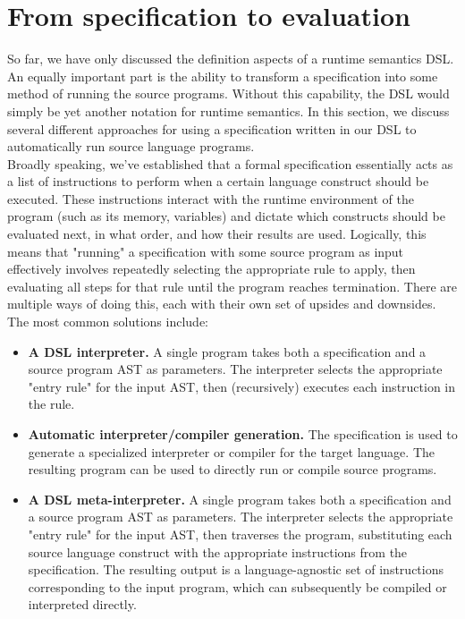 \section{From specification to evaluation}
\label{sec:design_evaluation}
So far, we have only discussed the definition aspects of a runtime semantics \ac{DSL}. An equally important part is the ability to transform a specification into some method of running the source programs. Without this capability, the \ac{DSL} would simply be yet another notation for runtime semantics. In this section, we discuss several different approaches for using a specification written in our \ac{DSL} to automatically run source language programs. \\

Broadly speaking, we've established that a formal specification essentially acts as a list of instructions to perform when a certain language construct should be executed. These instructions interact with the runtime environment of the program (such as its memory, variables) and dictate which constructs should be evaluated next, in what order, and how their results are used. Logically, this means that "running" a specification with some source program as input effectively involves repeatedly selecting the appropriate rule to apply, then evaluating all steps for that rule until the program reaches termination. There are multiple ways of doing this, each with their own set of upsides and downsides. The most common solutions include:

\begin{itemize}
  \item \textbf{A \ac{DSL} interpreter.} A single program takes both a specification and a source program AST as parameters. The interpreter selects the appropriate "entry rule" for the input AST, then (recursively) executes each instruction in the rule.
  \item \textbf{Automatic interpreter/compiler generation.} The specification is used to generate a specialized interpreter or compiler for the target language. The resulting program can be used to directly run or compile source programs.
  \item \textbf{A \ac{DSL} meta-interpreter.} A single program takes both a specification and a source program AST as parameters. The interpreter selects the appropriate "entry rule" for the input AST, then traverses the program, substituting each source language construct with the appropriate instructions from the specification. The resulting output is a language-agnostic set of instructions corresponding to the input program, which can subsequently be compiled or interpreted directly.
\end{itemize}


